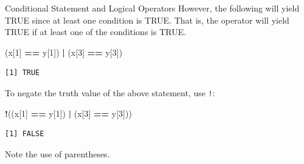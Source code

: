 \documentclass[
  ignorenonframetext,
]{beamer}
\newenvironment{Shaded}{\begin{snugshade}}{\end{snugshade}}
\newcommand{\DecValTok}[1]{\textcolor[rgb]{0.00,0.00,0.81}{#1}}
\newcommand{\NormalTok}[1]{#1}
\newcommand{\SpecialCharTok}[1]{\textcolor[rgb]{0.81,0.36,0.00}{\textbf{#1}}}
\begin{document}
\begin{frame}[fragile]{Conditional Statement and Logical Operators}
\label{conditional-statement-and-logical-operators-1}
However, the following will yield TRUE since at least one condition is
TRUE. That is, the \texttt{\textbar{}} operator will yield TRUE if at
least one of the conditions is TRUE.

\small

\begin{Shaded}
\begin{Highlighting}[]
\NormalTok{(x[}\DecValTok{1}\NormalTok{] }\SpecialCharTok{==}\NormalTok{ y[}\DecValTok{1}\NormalTok{]) }\SpecialCharTok{|}\NormalTok{ (x[}\DecValTok{3}\NormalTok{] }\SpecialCharTok{==}\NormalTok{ y[}\DecValTok{3}\NormalTok{])}
\end{Highlighting}
\end{Shaded}

\begin{verbatim}
[1] TRUE
\end{verbatim}

\normalsize

To negate the truth value of the above statement, use \texttt{!}:

\small

\begin{Shaded}
\begin{Highlighting}[]
\SpecialCharTok{!}\NormalTok{((x[}\DecValTok{1}\NormalTok{] }\SpecialCharTok{==}\NormalTok{ y[}\DecValTok{1}\NormalTok{]) }\SpecialCharTok{|}\NormalTok{ (x[}\DecValTok{3}\NormalTok{] }\SpecialCharTok{==}\NormalTok{ y[}\DecValTok{3}\NormalTok{]))}
\end{Highlighting}
\end{Shaded}

\begin{verbatim}
[1] FALSE
\end{verbatim}

\normalsize

Note the use of parentheses.
\end{frame}
\end{document}
